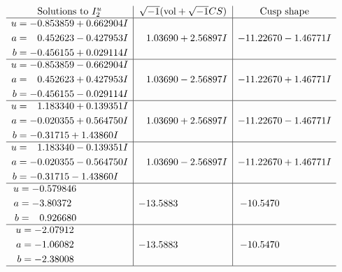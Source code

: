 \documentclass[1p]{elsarticle_modified}
\theoremstyle{definition}
\newcommand{\I}{\sqrt{-1}}
\begin{document}
$$\begin{array}{c|c|c}  
\text{Solutions to }I^u_{2}& \I (\text{vol} + \sqrt{-1}CS) & \text{Cusp shape}\\
 \hline 
\begin{aligned}
u &= -0.853859 + 0.662904 I \\
a &= \phantom{-}0.452623 - 0.427953 I \\
b &= -0.456155 + 0.029114 I\end{aligned}
 & \phantom{-}1.03690 + 2.56897 I & -11.22670 - 1.46771 I \\ \hline\begin{aligned}
u &= -0.853859 - 0.662904 I \\
a &= \phantom{-}0.452623 + 0.427953 I \\
b &= -0.456155 - 0.029114 I\end{aligned}
 & \phantom{-}1.03690 - 2.56897 I & -11.22670 + 1.46771 I \\ \hline\begin{aligned}
u &= \phantom{-}1.183340 + 0.139351 I \\
a &= -0.020355 + 0.564750 I \\
b &= -0.31715 + 1.43860 I\end{aligned}
 & \phantom{-}1.03690 + 2.56897 I & -11.22670 - 1.46771 I \\ \hline\begin{aligned}
u &= \phantom{-}1.183340 - 0.139351 I \\
a &= -0.020355 - 0.564750 I \\
b &= -0.31715 - 1.43860 I\end{aligned}
 & \phantom{-}1.03690 - 2.56897 I & -11.22670 + 1.46771 I \\ \hline\begin{aligned}
u &= -0.579846\phantom{ +0.000000I} \\
a &= -3.80372\phantom{ +0.000000I} \\
b &= \phantom{-}0.926680\phantom{ +0.000000I}\end{aligned}
 & -13.5883\phantom{ +0.000000I} & -10.5470\phantom{ +0.000000I} \\ \hline\begin{aligned}
u &= -2.07912\phantom{ +0.000000I} \\
a &= -1.06082\phantom{ +0.000000I} \\
b &= -2.38008\phantom{ +0.000000I}\end{aligned}
 & -13.5883\phantom{ +0.000000I} & -10.5470\phantom{ +0.000000I}\\
 \hline 
 \end{array}$$\newpage\newpage\renewcommand{\arraystretch}{1}
\end{document}
